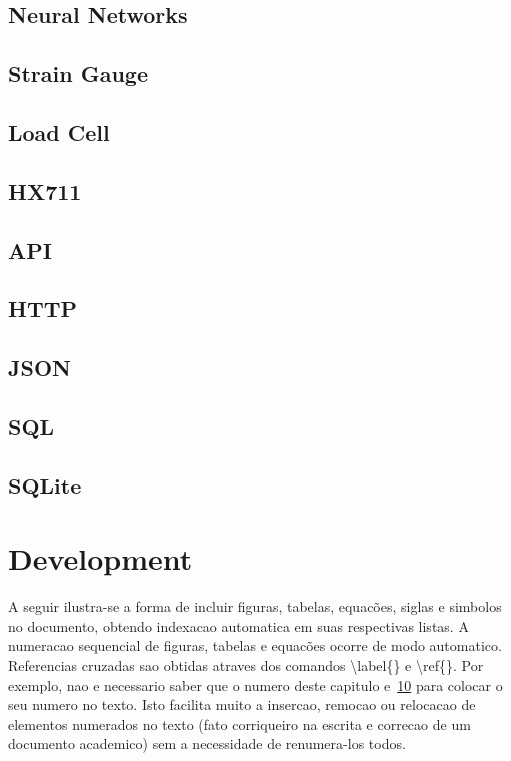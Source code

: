 \documentclass[openright]{normas-utf-tex} %
\begin{document}
\section{Neural Networks}

\section{Strain Gauge}

\section{Load Cell}

\section{HX711}

\section{API}

\section{HTTP}

\section{JSON}

\section{SQL}

\section{SQLite}

\chapter{Development}
\label{chap:desenv}

A seguir ilustra-se a forma de incluir figuras, tabelas, equac\~oes, siglas e simbolos no documento, obtendo indexacao automatica em suas respectivas listas. A numeracao sequencial de figuras, tabelas e equac\~oes ocorre de modo automatico. Referencias cruzadas sao obtidas atraves dos comandos {\ttfamily \textbackslash label\{\}} e {\ttfamily \textbackslash ref\{\}}. Por exemplo, nao e necessario saber que o numero deste capitulo e~\ref{chap:desenv} para colocar o seu numero no texto. Isto facilita muito a insercao, remocao ou relocacao de elementos numerados no texto (fato corriqueiro na escrita e correcao de um documento academico) sem a necessidade de renumera-los todos.
\end{document}
